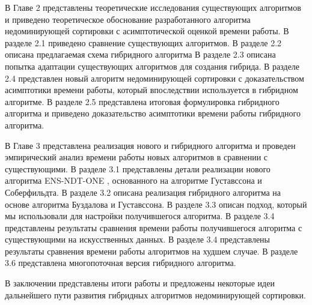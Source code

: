 В Главе 2 представлены теоретические исследования существующих алгоритмов и приведено теоретическое обоснование разработанного алгоритма недоминирующей сортировки с асимптотической оценкой времени работы.
В разделе 2.1 приведено сравнение существующих алгоритмов. 
В разделе 2.2 описана предлагаемая схема гибридного алгоритма 
В разделе 2.3 описана попытка адаптации существующих алгоритмов для создания гибрида. 
В разделе 2.4 представлен новый алгоритм недоминирующей сортировки с доказательством асимптотики времени работы, который впоследствии используется в гибридном алгоритме.
В разделе 2.5 представлена итоговая формулировка гибридного алгоритма и приведено доказательство асимптотики времени работы гибридного алгоритма.

В Главе 3 представлена реализация нового и гибридного алгоритма и проведен эмпирический анализ времени работы новых алгоритмов в сравнении с существующими.
В разделе 3.1 представлены детали реализации нового алгоритма ENS-NDT-ONE
, основанного на алгоритме Густавссона и Соберфильдта. 
В разделе 3.2 описана реализация гибридного алгоритма на основе алгоритма Буздалова и Густавссона.
В разделе 3.3 описан подход, который мы использовали для настройки получившегося алгоритма.
В разделе 3.4 представлены результаты сравнения времени работы получившегося алгоритма с существующими на искусственных данных.
В разделе 3.4 представлены результаты сравнения времени работы алгоритмов на худшем случае. 
В разделе 3.6 представлена многопоточная версия гибридного алгоритма.

В заключении представлены итоги работы и предложены некоторые идеи дальнейшего пути развития гибридных алгоритмов недоминирующей сортировки.